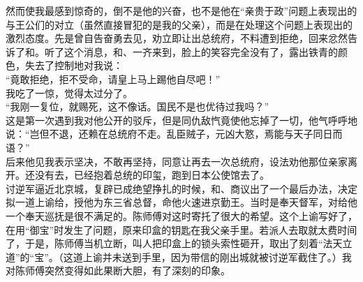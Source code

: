 然而使我最感到惊奇的，倒不是他的兴奋，也不是他在“亲贵于政”问题上表现出的与王公们的对立（虽然直接冒犯的是我的父亲），而是在处理这个问题上表现出的激烈态度。先是曾自告奋勇去见，劝立即让出总统府，不料遭到拒绝，回来忿然告诉了和。听了这个消息，和、一齐来到，脸上的笑容完全没有了，露出铁青的颜色，失去了控制地对我说：\\

“竟敢拒绝，拒不受命，请皇上马上踢他自尽吧！”\\

我吃了一惊，觉得太过分了。\\

“我刚一复位，就赐死，这不像话。国民不是也优待过我吗？”\\

这是第一次遇到我对他公开的驳斥，但是同仇敌忾竟使他忘掉了一切，他气呼呼地说：“岂但不退，还赖在总统府不走。乱臣贼子，元凶大憝，焉能与天子同日而语？”\\

后来他见我表示坚决，不敢再坚持，同意让再去一次总统府，设法劝他那位亲家离开。还没有去，已经抱着总统的印玺，跑到日本公使馆去了。\\

讨逆军逼近北京城，复辟已成绝望挣扎的时候，和、商议出了一个最后办法，决定拟一道上谕给，授他为东三省总督，命他火速进京勤王。当时是奉天督军，对给他一个奉天巡抚是很不满足的。陈师傅对这时寄托了很大的希望。这个上谕写好了，在用“御宝”时发生了问题，原来印盒的钥匙在我父亲手里。若派人去取就太费时间了，于是，陈师傅当机立断，叫人把印盒上的锁头索性砸开，取出了刻着“法天立道”的“宝”。（这道上谕并未送到手里，因为带信的刚出城就被讨逆军截住了。）我对陈师傅突然变得如此果断大胆，有了深刻的印象。\\

